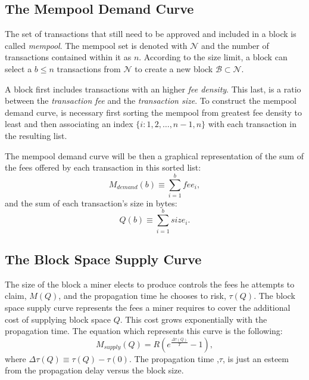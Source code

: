 \documentclass[USenglish]{uit-thesis}
\begin{document}
\subsection{The Mempool Demand Curve}
\label{sec:mempooldemand}
The set of transactions that still need to be approved and included in a block is called \emph{mempool}.
The mempool set is denoted with $\mathcal{N}$ and the number of transactions contained within it as $n$.
According to the size limit, a block can select a $b \leq n$ transactions from $\mathcal{N}$ to create a
new block $\mathcal{B} \subset \mathcal{N}$.

A block first includes transactions with an higher \emph{fee density}. This last, is a ratio between
the \emph{transaction fee} and the \emph{transaction size}.  To construct the mempool demand
curve, is necessary first sorting the mempool from greatest fee density to least and then
associating an index $\{i: 1,2,\dots,n-1,n\}$ with each transaction in the resulting list.

The mempool demand curve will be then a graphical representation of the sum of the fees offered
by each transaction in this sorted list:
\begin{equation}
\label{eq:memdemandcurve}
M_{demand}(b) \equiv \sum_{i=1}^{b} fee_i,
\end{equation}
and the sum of each transaction's size in bytes:
\begin{equation}
\label{eq:transactionsize}
Q(b) \equiv \sum_{i = 1}^{b} size_i.
\end{equation}

\subsection{The Block Space Supply Curve}
\label{sec:blockspacesupply}
The size of the block a miner elects to produce controls the fees he attempts to claim, $M(Q)$,
and the propagation time he chooses to risk, $\tau(Q)$. The block space supply curve represents
the fees a miner requires to cover the additional cost of supplying block space $Q$. This cost grows
exponentially with the propagation time. The equation which represents this curve is the
following:
\begin{equation}
\label{eq:blockspacesupply}
M_{supply}(Q) = R\left(e^{\frac{\Delta \tau (Q)}{T}} - 1\right),
\end{equation}
where $\Delta \tau (Q) \equiv \tau(Q) - \tau(0)$. The propagation time ,$\tau$, is just an esteem from
the propagation delay versus the block size.
\end{document}
